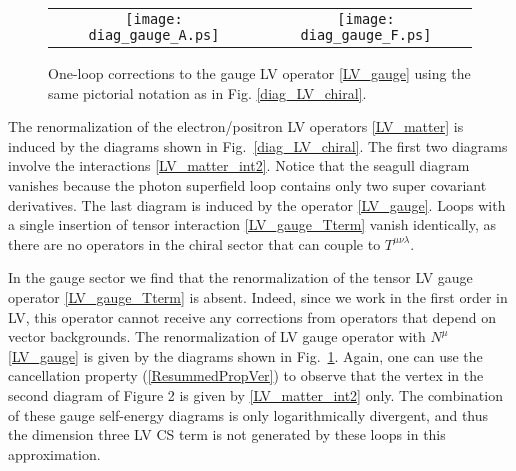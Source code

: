 \documentclass[12pt]{revtex4}
\begin{document}
\begin{figure}
\begin{center}
\begin{tabular}{cc}
\texttt{[image: diag\_gauge\_A.ps]}
&
\texttt{[image: diag\_gauge\_F.ps]}
\end{tabular}
\end{center}
\caption{\label{diag_LV_gauge}
One-loop corrections to the gauge LV operator 
\eqref{LV_gauge} using the same pictorial notation as in Fig. 
\ref{diag_LV_chiral}. 
}
\end{figure}


The renormalization of the electron/positron LV operators
\eqref{LV_matter} is induced by the diagrams shown in 
Fig.~\ref{diag_LV_chiral}. The first two diagrams involve the
interactions \eqref{LV_matter_int2}. Notice that the seagull diagram
vanishes because the photon superfield loop contains only two super
covariant derivatives. The last diagram is induced by the operator  
\eqref{LV_gauge}. Loops with a single insertion of tensor
interaction \eqref{LV_gauge_Tterm} vanish identically, as there are no
operators in the chiral sector that can couple to $T^{\mu\nu\lambda}$. 


In the gauge sector we find that the renormalization of the tensor LV
gauge operator \eqref{LV_gauge_Tterm} is absent. Indeed, since we 
work in the first order in LV, this operator cannot receive any
corrections from operators that depend on vector backgrounds. The
renormalization of LV gauge operator with $N^\mu$ \eqref{LV_gauge} 
is given by the diagrams shown in Fig.~\ref{diag_LV_gauge}. 
Again, one can use the cancellation property (\ref{ResummedPropVer}) 
to observe that the vertex in the second diagram of Figure 2 is given
by \eqref{LV_matter_int2} only. The combination of these gauge
self-energy diagrams is only logarithmically divergent, and thus the
dimension three LV CS term is not generated by these loops
in this approximation.   
\end{document}
